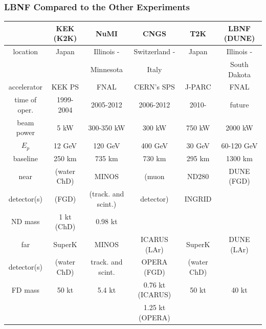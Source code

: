 \begin{frame}\frametitle{LBNF Compared to the Other Experiments \cite{ref_LBN_OscExpReview}}
\tiny
  \begin{tabular}{|c|c|c|c|c|c|}
              & KEK (K2K) & NuMI & CNGS & T2K & LBNF (DUNE)\\ \hline
     location & Japan  & Illinois - & Switzerland - & Japan & Illinois - \\ 
              &        & Minnesota & Italy &  & South Dakota\\ \hline
     accelerator & KEK PS  & FNAL & CERN's SPS & J-PARC & FNAL\\ \hline
     time of oper. & 1999-2004  & 2005-2012 & 2006-2012 & 2010- & future \\ \hline 
     beam power  &  5 kW  & 300-350 kW  & 300 kW & 750 kW & 2000 kW\\ \hline 
     $E_p$  & 12 GeV & 120 GeV & 400 GeV & 30 GeV & 60-120 GeV\\ \hline 
     baseline  & 250 km & 735 km & 730 km & 295 km & 1300 km\\ \hline 
     near        & (water ChD) & MINOS               & (muon               & ND280       & DUNE (FGD)\\  
     detector(s) & (FGD)       & (track. and scint.) & detector)           & INGRID      & \\ \hline 
     ND mass     & 1 kt (ChD)  & 0.98 kt             &                     &             & \\ \hline 
     far         & SuperK      & MINOS               & ICARUS (LAr)        & SuperK      & DUNE (LAr)\\  
     detector(s) & (water ChD) & track. and scint.   & OPERA (FGD)        & (water ChD) & \\ \hline 
     FD mass     & 50 kt       & 5.4 kt              & 0.76 kt (ICARUS)   & 50 kt       & 40 kt\\ 
                 &             &                     & 1.25 kt (OPERA)    &             & \\ \hline 
 \end{tabular}
\end{frame}
